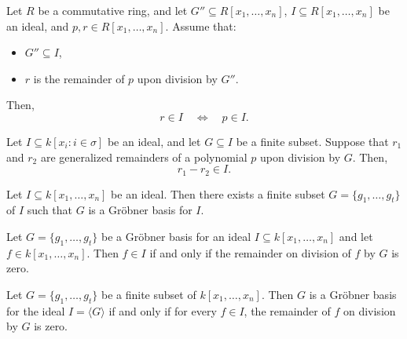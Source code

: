 \begin{lemma}\label{remainder_mem_ideal_iff}
  \leanok
  Let \( R \) be a commutative ring, and let \( G'' \subseteq R[x_1, \dots, x_n] \), \( I \subseteq R[x_1, \dots, x_n] \) be an ideal, and \( p, r \in R[x_1, \dots, x_n] \).
Assume that:
\begin{itemize}
\item \( G'' \subseteq I \),
\item \( r \) is the remainder of \( p \) upon division by \( G'' \).
\end{itemize}
Then,
\[
r \in I \quad \Longleftrightarrow \quad p \in I.
\]

\end{lemma}

\begin{lemma}\label{remainder_sub_remainder_mem_ideal}
  \leanok
  Let \( I \subseteq k[x_i : i \in \sigma] \) be an ideal, and let \( G \subseteq I \) be a finite subset.
Suppose that \( r_1 \) and \( r_2 \) are generalized remainders of a polynomial \( p \) upon division by \( G \).
Then,
\[
r_1 - r_2 \in I.
\]

\end{lemma}

\begin{lemma}\label{exists_groebner_basis}
  \leanok
  Let \( I \subseteq k[x_1, \ldots, x_n] \) be an ideal. Then there exists a finite subset \( G = \{g_1, \ldots, g_t\} \) of \( I \) such that \( G \) is a Gröbner basis for \( I \).
\end{lemma}

\begin{lemma}\label{groebner_basis_isRemainder_zero_iff_mem_span}

  Let \( G = \{g_1, \dots, g_t\} \) be a Gröbner basis for an ideal \( I \subseteq k[x_1, \dots, x_n] \) and let \( f \in k[x_1, \dots, x_n] \). Then \( f \in I \) if and only if the remainder on division of \( f \) by \( G \) is zero.
\end{lemma}

\begin{lemma}\label{is_groebner_basis_iff}

  Let \( G = \{g_1, \ldots, g_t\} \) be a finite subset of \( k[x_1, \ldots, x_n] \). Then \( G \) is a Gröbner basis for the ideal \( I = \langle G \rangle \) if and only if  for every \( f \in I \), the remainder of \( f \) on division by \( G \) is zero.
\end{lemma}

